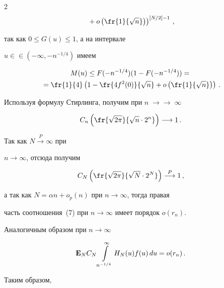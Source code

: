 \begin{multicols}{2}
\begin{multline}
\left.{} +o\left(\fr{1}{\sqrt{n}}\right)\right)^{\left[N/2\right]-1}\,,


 \label{7}


\end{multline}


так как $0\leq G(u) \leq 1$, а на интервале  


$ u\in$\linebreak $\in (-\infty, -n^{-1/4})$ имеем


\begin{multline*}


M(u)\leq


F(-n^{-1/4})(1-F(-n^{-1/4}))={}\\


{}=


\fr{1}{4}\left(1-\fr{4f^2(0)}{\sqrt{n}}+o\left(\fr{1}{\sqrt{n}}


\right)\right)\,.


\end{multline*}


Используя формулу Стирлинга, получим при $n\;\to$\linebreak $\to\;\infty$


\begin{equation}


C_n \left(\fr{\sqrt{2\pi}}{\sqrt{n}\cdot 2^n}\right)\longrightarrow 1\,.


\label{8}


\end{equation}


Так как $ N \stackrel{P}{\longrightarrow}\infty$ при


$n \to \infty$, отсюда получим


$$


C_N\left(\fr{\sqrt{2\pi}}{\sqrt{N}\cdot 2^N}\right)\stackrel{P}{\longrightarrow}1\,,


$$


а так  как  $N=\alpha n+o_p(n)$ при  $n \to \infty$, тогда правая


часть соотношения~(7) при $n \to \infty$ имеет порядок $o(r_n)$.


Аналогичным образом при $n \to \infty$


$$


{\bf E}_NC_N\int\limits_{n^{-1/4}}^{\infty}H_N(u)f(u)\,du=o(r_n)\,.


$$


Таким  образом,


\begin{equation}



\end{equation}
\end{multicols}
